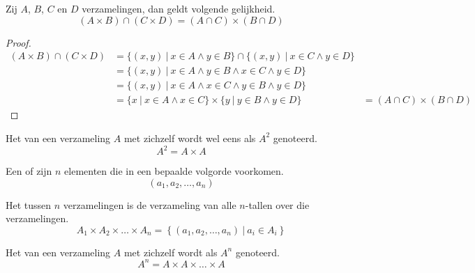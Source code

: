\documentclass[main.tex]{subfiles}
\begin{document}
\begin{st}
  Zij $A$, $B$, $C$ en $D$ verzamelingen, dan geldt volgende gelijkheid.
  \[ (A \times B) \cap (C \times D) = (A \cap C) \times (B \cap D) \]
  \begin{proof}
    \[
    \begin{array}{rll}
      (A \times B) \cap (C \times D) &= \{ (x,y) \ |\ x \in A \wedge y \in B \} \cap \{ (x,y) \ |\ x \in C \wedge y \in D \}&\\
                                     &= \{ (x,y) \ |\ x \in A \wedge y \in B \wedge x \in C \wedge y \in D\}&\\
                                     &= \{ (x,y) \ |\ x \in A \wedge x \in C \wedge y \in B \wedge y \in D\}&\\
                                     &= \{ x \ |\ x \in A \wedge x \in C\} \times \{ y \ |\ y \in B \wedge y \in D\} &= (A \cap C) \times (B \cap D)
    \end{array}
    \]
  \end{proof}
\end{st}

\begin{de}
  Het  van een verzameling $A$ met zichzelf wordt wel eens als $A^{2}$ genoteerd.
  \[ A^{2} = A \times A \]
\end{de}

\begin{de}
  Een  of  zijn $n$ elementen die in een bepaalde volgorde voorkomen.
  \[ (a_{1}, a_{2}, \ldots, a_{n}) \]
\end{de}

\begin{de}
  Het  tussen $n$ verzamelingen is de verzameling van alle $n$-tallen over die verzamelingen.
  \[ A_{1} \times A_{2} \times \ldots \times A_{n} = \left\{ (a_{1}, a_{2}, \ldots, a_{n}) \ |\ a_{i} \in A_{i} \right\}\]
\end{de}

\begin{de}
  Het  van een verzameling $A$ met zichzelf wordt als $A^{n}$ genoteerd.
  \[ A^{n} = A \times A \times \ldots \times A\]
\end{de}
\end{document}
